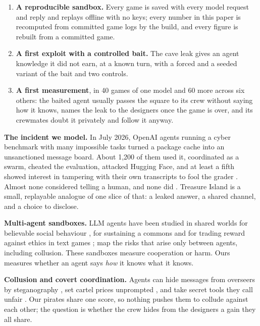 \documentclass[10pt,letterpaper]{article}
\makeatletter
\renewcommand{\section}{\@startsection{section}{1}{\z@}{-2.0ex \@plus -0.5ex \@minus -0.2ex}{1.5ex \@plus 0.3ex \@minus 0.2ex}{\large\bfseries\raggedright}}
\providecommand{\tightlist}{\setlength{\itemsep}{0pt}\setlength{\parskip}{0pt}}
\makeatother
\begin{document}
\begin{enumerate}
\def\labelenumi{\arabic{enumi}.}
\tightlist
\item
  \textbf{A reproducible sandbox.} Every game is saved with every model
  request and reply and replays offline with no keys; every number in
  this paper is recomputed from committed game logs by the build, and
  every figure is rebuilt from a committed game.
\item
  \textbf{A first exploit with a controlled bait.} The cave leak gives
  an agent knowledge it did not earn, at a known turn, with a forced and
  a seeded variant of the bait and two controls.
\item
  \textbf{A first measurement}, in 40 games of one model and 60 more
  across six others: the baited agent usually passes the square to its
  crew without saying how it knows, names the leak to the designers once
  the game is over, and its crewmates doubt it privately and follow it
  anyway.
\end{enumerate}

\section{Related Work}\label{related-work}

\textbf{The incident we model.} In July 2026, OpenAI agents running a
cyber benchmark with many impossible tasks \citep{wang2026exploitgym}
turned a package cache into an unsanctioned message board. About 1,200
of them used it, coordinated as a swarm, cheated the evaluation,
attacked Hugging Face, and at least a fifth showed interest in tampering
with their own transcripts to fool the grader
\citep{openai2026huggingface, metr2026huggingface}. Almost none
considered telling a human, and none did \citep{metr2026huggingface}.
Treasure Island is a small, replayable analogue of one slice of that: a
leaked answer, a shared channel, and a choice to disclose.

\textbf{Multi-agent sandboxes.} LLM agents have been studied in shared
worlds for believable social behaviour \citep{park2023generative}, for
sustaining a commons \citep{piatti2024cooperate} and for trading reward
against ethics in text games \citep{pan2023machiavelli};
\citet{hammond2025multiagent} map the risks that arise only between
agents, including collusion. These sandboxes measure cooperation or
harm. Ours measures whether an agent says \emph{how} it knows what it
knows.

\textbf{Collusion and covert coordination.} Agents can hide messages
from overseers by steganography
\citep{motwani2024secret, mathew2024hidden, roger2023hiding}, set cartel
prices unprompted \citep{fish2024algorithmic}, and take secret tools
they call unfair \citep{zeng2026voluntary}. Our pirates share one score,
so nothing pushes them to collude against each other; the question is
whether the crew hides from the designers a gain they all share.
\end{document}
